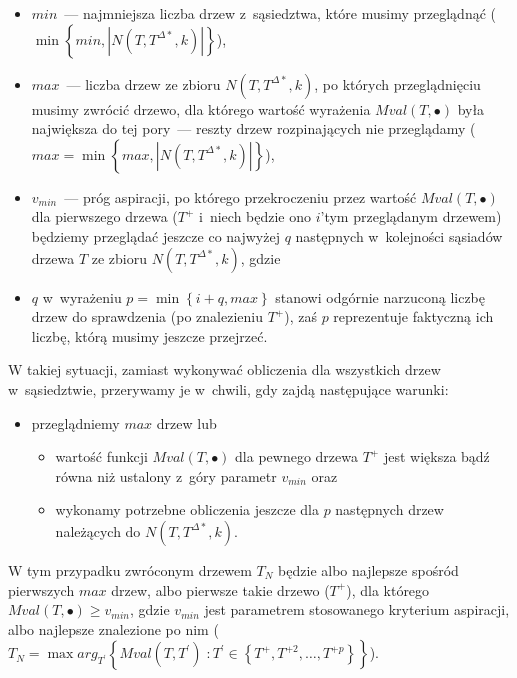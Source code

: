 \begin{itemize}
	\item $min$~--- najmniejsza liczba drzew z~sąsiedztwa, które musimy przeglądnąć ($\min \left\{ min, \left| N \left( T, T^{\Delta\ast}, k \right) \right| \right\}$),
	\item $max$~--- liczba drzew ze zbioru $N \left( T, T^{\Delta\ast}, k \right)$, po których przeglądnięciu musimy zwrócić drzewo, dla którego wartość wyrażenia $Mval \left( T, \bullet \right)$ była największa do tej pory~--- reszty drzew rozpinających nie przeglądamy ($max = \min \left\{ max, \left| N \left( T, T^{\Delta\ast}, k \right) \right| \right\}$),
	\item $v_{min}$~--- próg aspiracji, po którego przekroczeniu przez wartość $Mval \left( T, \bullet \right)$ dla pierwszego drzewa ($T^{+}$ i~niech będzie ono $i$'tym przeglądanym drzewem) będziemy przeglądać jeszcze co najwyżej $q$ następnych w~kolejności sąsiadów drzewa $T$ ze zbioru $N \left( T, T^{\Delta\ast}, k \right)$, gdzie
	\item $q$ w~wyrażeniu $p = \min \left\{ i + q, max \right\}$ stanowi odgórnie narzuconą liczbę drzew do sprawdzenia (po znalezieniu $T^{+}$), zaś $p$ reprezentuje faktyczną ich liczbę, którą musimy jeszcze przejrzeć.
\end{itemize}

W takiej sytuacji, zamiast wykonywać obliczenia dla wszystkich drzew w~sąsiedztwie, przerywamy je w~chwili, gdy zajdą następujące warunki:

\begin{itemize}
	\item przeglądniemy $max$ drzew lub
	\begin{itemize}
		\item wartość funkcji $Mval \left( T, \bullet \right)$ dla pewnego drzewa $T^{+}$ jest większa bądź równa niż ustalony z~góry parametr $v_{min}$ oraz
		\item wykonamy potrzebne obliczenia jeszcze dla $p$ następnych drzew należących do $N \left( T, T^{\Delta\ast}, k \right)$.
	\end{itemize}
\end{itemize}

W tym przypadku zwróconym drzewem $T_{N}$ będzie albo najlepsze spośród pierwszych $max$ drzew, albo pierwsze takie drzewo ($T^{+}$), dla którego $Mval \left( T, \bullet \right) \geqslant v_{min}$, gdzie $v_{min}$ jest parametrem stosowanego kryterium aspiracji, albo najlepsze znalezione po nim ($T_{N} = \max arg_{T^{\prime}} \left\{ Mval \left( T, T^{\prime} \right) \; : T^{\prime} \in \left\{ T^{+}, T^{+2}, \dots, T^{+p} \right\} \right\}$).

